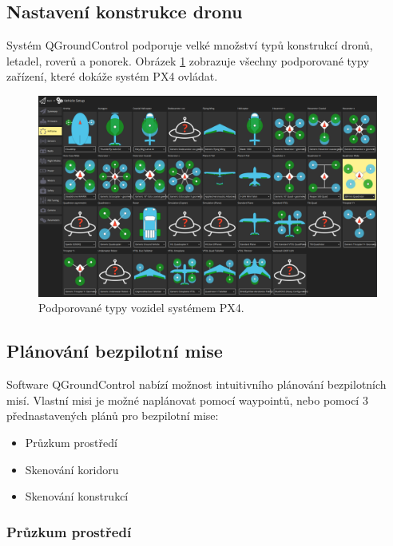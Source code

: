 \subsection{Nastavení konstrukce dronu}

Systém QGroundControl podporuje velké množství typů konstrukcí dronů, letadel, roverů a ponorek. Obrázek \ref{fig:QGC1} zobrazuje všechny podporované typy zařízení, které dokáže systém PX4 ovládat.

\begin{figure}[!ht]
    \begin{center}
        \includegraphics[scale=0.3]{obrazky/QG2}
    \end{center}
    \caption[Podporované typy vozidel systémem PX4]{Podporované typy vozidel systémem PX4.}
    \label{fig:QGC1}
\end{figure}

\subsection{Plánování bezpilotní mise}
\label{subs:planovani}

Software QGroundControl nabízí možnost intuitivního plánování bezpilotních misí. Vlastní misi je možné naplánovat pomocí waypointů, nebo pomocí 3 přednastavených plánů pro bezpilotní mise: \cite{QGround2}

\begin{itemize}
    \item Průzkum prostředí
    \item Skenování koridoru
    \item Skenování konstrukcí
\end{itemize}

\subsubsection{Průzkum prostředí}


